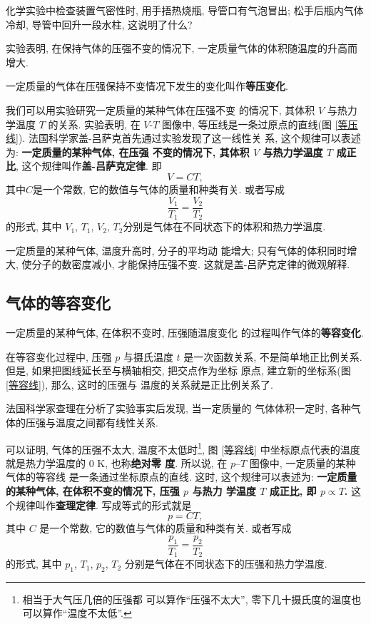 \documentclass[11pt,a4paper]{ctexbook}
\begin{document}
{\kaishu 化学实验中检查装置气密性时, 用手捂热烧瓶, 导管口有气泡冒出; 松手后瓶内气体冷却, 导管中回升一段水柱, 这说明了什么?}

实验表明, 在保持气体的压强不变的情况下, 一定质量气体的体积随温度的升高而增大.

一定质量的气体在压强保持不变情况下发生的变化叫作\textbf{等压变化}.

我们可以用实验研究一定质量的某种气体在压强不变
的情况下, 其体积 $V$ 与热力学温度 $T$ 的关系. 实验表明, 在
$V$-$T$ 图像中, 等压线是一条过原点的直线(图 \ref{等压线}).
法国科学家盖-吕萨克首先通过实验发现了这一线性关
系, 这个规律可以表述为: \textbf{一定质量的某种气体, 在压强
不变的情况下, 其体积 $V$ 与热力学温度 $T$ 成正比},
这个规律叫作\textbf{盖-吕萨克定律}. 即
$$V = CT,$$其中$C$是一个常数, 它的数值与气体的质量和种类有关.
或者写成$$\frac{V_1}{T_1} = \frac{V_2}{T_2}$$的形式,
其中 $V_1$, $T_1$, $V_2$, $T_2$分别是气体在不同状态下的体积和热力学温度.

一定质量的某种气体, 温度升高时, 分子的平均动
能增大; 只有气体的体积同时增大, 使分子的数密度减小,
才能保持压强不变. 这就是盖-吕萨克定律的微观解释.

\subsection{气体的等容变化}

一定质量的某种气体, 在体积不变时, 压强随温度变化
的过程叫作气体的\textbf{等容变化}.

在等容变化过程中, 压强 $p$ 与摄氏温度 $t$ 是一次函数关系, 不是简单地正比例关系.
但是, 如果把图线延长至与横轴相交, 把交点作为坐标
原点, 建立新的坐标系(图 \ref{等容线}), 那么, 这时的压强与
温度的关系就是正比例关系了.

法国科学家查理在分析了实验事实后发现, 当一定质量的
气体体积一定时, 各种气体的压强与温度之间都有线性关系.

可以证明, 气体的压强不太大, 温度不太低时\footnote{相当于大气压几倍的压强都
可以算作``压强不太大'', 零下几十摄氏度的温度也可以算作``温度不太低''.},
图 \ref{等容线} 中坐标原点代表的温度就是热力学温度的 0 K, 也称\textbf{绝对零
度}. 所以说, 在 $p$–$T$ 图像中, 一定质量的某种气体的等容线
是一条通过坐标原点的直线. 这时, 这个规律可以表述为:
\textbf{一定质量的某种气体, 在体积不变的情况下, 压强 $p$ 与热力
学温度 $T$ 成正比, 即 $p \propto T$.} 这个规律叫作\textbf{查理定律}.
写成等式的形式就是$$p = CT,$$ 其中 $C$ 是一个常数, 它的数值与气体的质量和种类有关.
或者写成$$\frac{p_1}{T_1} = \frac{p_2}{T_2}$$的形式,
其中 $p_1$, $T_1$, $p_2$, $T_2$ 分别是气体在不同状态下的压强和热力学温度.
\end{document}
